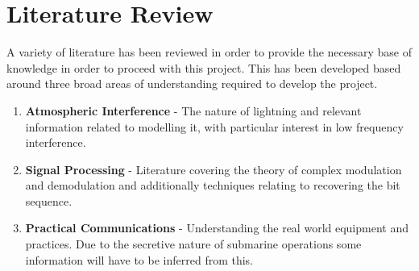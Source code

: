 \chapter{Literature Review}

A variety of literature has been reviewed in order to provide the necessary base of knowledge in order to proceed with this project. This has been developed based around three broad areas of understanding required to develop the project.

\begin{enumerate}[i]
    \item \textbf{Atmospheric Interference} - The nature of lightning and relevant information related to modelling it, with particular interest in low frequency interference.
    \item \textbf{Signal Processing} - Literature covering the theory of complex modulation and demodulation and additionally techniques relating to recovering the bit sequence.
    \item \textbf{Practical Communications} - Understanding the real world equipment and practices. Due to the secretive nature of submarine operations some information will have to be inferred from this.
\end{enumerate}

